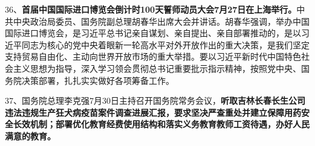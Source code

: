 36、{\textbf{首届中国国际进口博览会倒计时100天誓师动员大会7月27日在上海举行。}}中共中央政治局委员、国务院副总理胡春华出席大会并讲话。胡春华强调，举办中国国际进口博览会，是习近平总书记亲自谋划、亲自提出、亲自部署推动的，是以习近平同志为核心的党中央着眼新一轮高水平对外开放作出的重大决策，是我们坚定支持贸易自由化、主动向世界开放市场的重大举措。要以习近平新时代中国特色社会主义思想为指导，深入学习领会贯彻总书记重要批示指示精神，按照党中央、国务院决策部署，扎扎实实做好各项筹备工作。

37、国务院总理李克强7月30日主持召开国务院常务会议，{\textbf{听取吉林长春长生公司违法违规生产狂犬病疫苗案件调查进展汇报，要求坚决严查重处并建立保障用药安全长效机制；部署优化教育经费使用结构和落实义务教育教师工资待遇，办好人民满意的教育。}}
